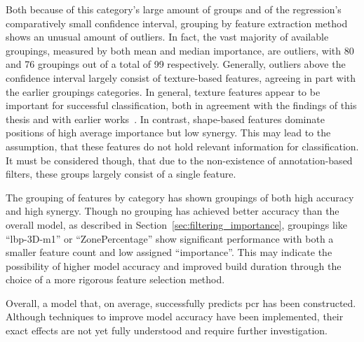 Both because of this category's large amount of groups and of the regression's
comparatively small confidence interval, grouping by feature extraction method
shows an unusual amount of outliers. In fact, the vast majority of available 
groupings, measured by both mean and median importance, are outliers, with 
80 and 76 groupings out of a total of 99 respectively. Generally, outliers
above the confidence interval largely consist of texture-based features, 
agreeing in part with the earlier groupings categories. In general, texture
features appear to be important for successful classification, both in agreement
with the findings of this thesis and with earlier works~\cite{rectal_radiomics_svm_rf,radiomics_analysis_pcr_rectal}.
In contrast, shape-based
features dominate positions of high average importance but low synergy. This
 may lead to the assumption, that these features do not hold relevant 
information for classification. It must be considered though, that due to 
the non-existence of annotation-based filters, these groups largely consist of
a single feature. 

The grouping of features by category has shown groupings of both high accuracy
and high synergy. Though no grouping has achieved better accuracy than the 
overall model, as described in Section~\ref{sec:filtering_importance}, groupings
like \enquote{lbp-3D-m1} or \enquote{ZonePercentage} show significant performance with both a smaller 
feature count and low assigned \enquote{importance}. This may indicate the 
possibility of higher model accuracy and improved build duration through the
choice of a more rigorous feature selection method.

Overall, a model that, on average, successfully predicts \ac{pcr} has been 
constructed. Although techniques to improve model accuracy have been 
implemented, their exact effects are not yet fully understood and require further 
investigation.



\newpage{}